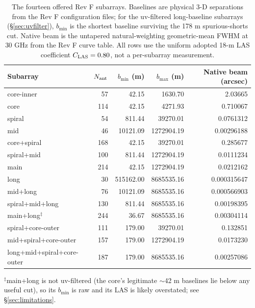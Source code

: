 \documentclass[11pt]{article}
\begin{document}
\begin{table}[tb]
\centering
\small
\caption{The fourteen offered Rev F subarrays.  Baselines are physical
3-D separations from the Rev F configuration files; for the uv-filtered
long-baseline subarrays (\S\ref{sec:uvfilter}), $b_{\min}$ is the shortest
baseline surviving the 178 m spurious-shorts cut.  Native beam is the
untapered natural-weighting geometric-mean FWHM at 30 GHz from the Rev F
curve table.  All rows use the uniform adopted 18-m LAS coefficient
$C_{\rm LAS}=0.80$, not a per-subarray measurement.}
\label{tab:subarrays}
\setlength{\tabcolsep}{4pt}
\footnotesize
\begin{tabular}{lrrrr}
\toprule
Subarray & $N_{\rm ant}$ & $b_{\min}$ (m) & $b_{\max}$ (m) &
Native beam (arcsec) \\
\midrule
core-inner  &  57 &    42.15 &    1630.70 & 2.03665 \\
core        & 114 &    42.15 &    4271.93 & 0.710067 \\
spiral      &  54 &   811.44 &   39270.01 & 0.0761312 \\
mid         &  46 & 10121.09 & 1272904.19 & 0.00296188 \\
core+spiral & 168 &    42.15 &   39270.01 & 0.285677 \\
spiral+mid  & 100 &   811.44 & 1272904.19 & 0.0111234 \\
main        & 214 &    42.15 & 1272904.19 & 0.0212162 \\
long        &  30 & 515162.00 & 8685535.16 & 0.000315647 \\
mid+long    &  76 & 10121.09 & 8685535.16 & 0.000566903 \\
spiral+mid+long & 130 & 811.44 & 8685535.16 & 0.00198395 \\
main+long$^{\ddagger}$ & 244 & 36.67 & 8685535.16 & 0.00304114 \\
spiral+core-outer & 111 & 179.00 & 39270.01 & 0.132851 \\
mid+spiral+core-outer & 157 & 179.00 & 1272904.19 & 0.0173230 \\
long+mid+spiral+core-outer & 187 & 179.00 & 8685535.16 & 0.00257086 \\
\bottomrule
\end{tabular}
\par\smallskip
\small $^{\ddagger}$main+long is not uv-filtered (the core's legitimate
$\sim$42 m baselines lie below any useful cut), so its $b_{\min}$ is raw and
its LAS is likely overstated; see \S\ref{sec:limitations}.
\end{table}
\end{document}
